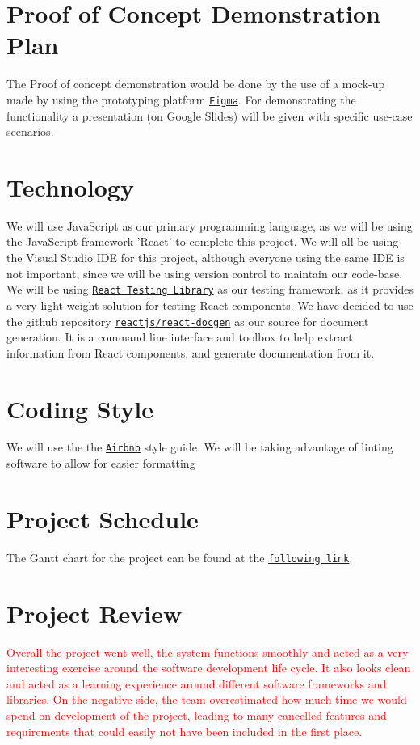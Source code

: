 \documentclass{article}
\begin{document}
\section{Proof of Concept Demonstration Plan}
The Proof of concept demonstration would be done by the use of a mock-up made by using the prototyping platform \texttt{\href{https://www.figma.com/files/recent}{Figma}}. For demonstrating the functionality a presentation (on Google Slides) will be given with specific use-case scenarios.

\section{Technology}
We will use JavaScript as our primary programming language, as we will be using the JavaScript framework 'React' to complete this project. We will all be using the Visual Studio IDE for this project, although everyone using the same IDE is not important, since we will be using version control to maintain our code-base. We will be using \texttt{\href{https://testing-library.com/docs/react-testing-library/intro/}{React Testing Library}} as our testing framework, as it provides a very light-weight solution for testing React components. We have decided to use the github repository \texttt{\href{https://github.com/reactjs/react-docgen}{reactjs/react-docgen}} as our source for document generation. It is a command line interface and toolbox to help extract information from React components, and generate documentation from it.

\section{Coding Style}
We will use the the \href{https://github.com/airbnb/javascript}{\texttt{Airbnb}} style guide. We will be taking advantage of linting software to allow for easier formatting

\section{Project Schedule}

The Gantt chart for the project can be found at the \href{https://gitlab.cas.mcmaster.ca/celsj/3xa3-group2-chess/-/blob/master/Docs/DevelopmentPlan/3XA3ChessProject.gan}{\texttt{following link}}.

\section{Project Review}
    \textcolor{red}{Overall the project went well, the system functions smoothly and acted as a very interesting exercise around the software development life cycle. It also looks clean and acted as a learning experience around different software frameworks and libraries. On the negative side, the team overestimated how much time we would spend on development of the project, leading to many cancelled features and requirements that could easily not have been included in the first place.}\\
    
\end{document}
